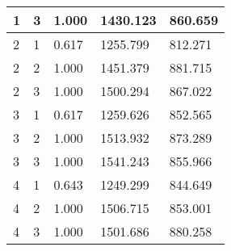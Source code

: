 \documentclass[11pt,a4paper,draft]{article}
\begin{document}
\begin{tabular}{lllll}
	1 & 3 &  1.000 & 1430.123 & 860.659 \\
	\hline 
	2 & 1 &  0.617 & 1255.799 & 812.271 \\
	2 & 2 &  1.000 & 1451.379 & 881.715 \\
	2 & 3 &  1.000 & 1500.294 & 867.022 \\
	\hline 
	3 & 1 &  0.617 & 1259.626 & 852.565 \\
	3 & 2 &  1.000 & 1513.932 & 873.289 \\
	3 & 3 &  1.000 & 1541.243 & 855.966 \\
	\hline 
	4 & 1 &  0.643 & 1249.299 & 844.649 \\
	4 & 2 &  1.000 & 1506.715 & 853.001 \\
	4 & 3 &  1.000 & 1501.686 & 880.258 \\
	\hline 
	\hline  
\end{tabular}
	
\end{document}
